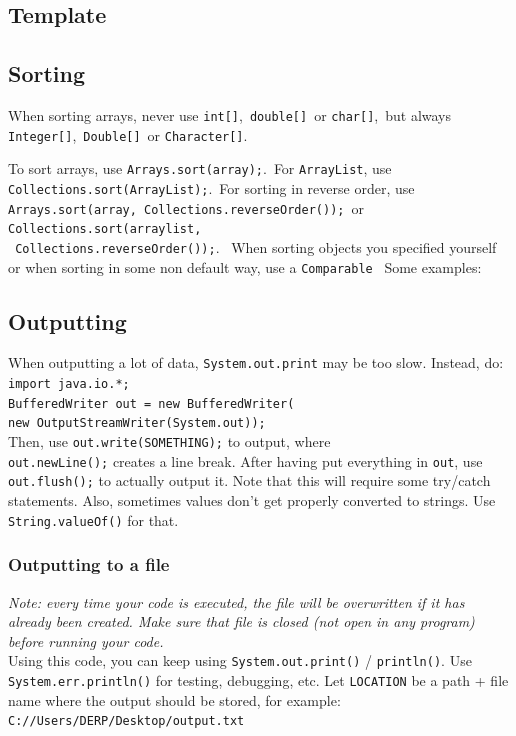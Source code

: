 \documentclass[a4paper,10pt]{article}
\begin{document}
\begin{multicols}{2}

\subsection{Template}


\subsection{Sorting}
When sorting arrays, never use \lstinline|int[]|,\noindent\ \lstinline|double[]|\noindent\ or \lstinline|char[]|,\noindent\ but always \lstinline|Integer[]|,\noindent\ \lstinline|Double[]|\noindent\ or \lstinline|Character[]|.\noindent\ 

To sort arrays, use \lstinline|Arrays.sort(array);|.\noindent\ For \lstinline|ArrayList|, use \lstinline|Collections.sort(ArrayList);|.\noindent\ For sorting in reverse order, use \lstinline|Arrays.sort(array, Collections.reverseOrder());|\noindent\ or \lstinline|Collections.sort(arraylist,|\\\lstinline| Collections.reverseOrder());|.
\noindent\
When sorting objects you specified yourself or when sorting in some non default way, use a \lstinline|Comparable|\noindent\ %
Some examples:


\subsection{Outputting}
When outputting a lot of data, \lstinline|System.out.print| may be too slow. Instead, do: \lstinline|import java.io.*;|\\
\lstinline|BufferedWriter out = new BufferedWriter(|\\
\tab\tab\lstinline|new OutputStreamWriter(System.out));|\\
Then, use \lstinline|out.write(SOMETHING);| to output, where \\\lstinline|out.newLine();| creates a line break. After having put everything in \lstinline|out|, use \lstinline|out.flush();| to actually output it. Note that this will require some try/catch statements. Also, sometimes values don't get properly converted to strings. Use \lstinline|String.valueOf()| for that.
\subsubsection{Outputting to a file}
\textit{Note: every time your code is executed, the file will be overwritten if it has already been created. Make sure that file is closed (not open in any program) before running your code.}\\
Using this code, you can keep using \lstinline|System.out.print()| / \lstinline|println()|. Use \lstinline|System.err.println()| for testing, debugging, etc. Let \lstinline|LOCATION| be a path + file name where the output should be stored, for example:\\\texttt{C://Users/DERP/Desktop/output.txt}



\end{multicols}
\end{document}

